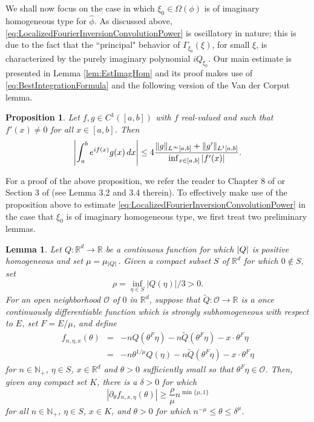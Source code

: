 \documentclass[11pt]{article}
\newtheorem{lemma}[theorem]{Lemma}
\newtheorem{proposition}[theorem]{Proposition}
\theoremstyle{remark}
\begin{document}
\noindent We shall now focus on the case in which $\xi_0\in\Omega(\phi)$ is of imaginary homogeneous type for $\widehat{\phi}$. As discussed above,  \eqref{eq:LocalizedFourierInversionConvolutionPower} is oscillatory in nature; this is due to the fact that the ``principal" behavior of $\Gamma_{\xi_0}(\xi)$, for small $\xi$, is characterized by the purely imaginary polynomial $iQ_{\xi_0}$. Our main estimate is presented in Lemma \ref{lem:EstImagHom} and its proof makes use of \eqref{eq:BestIntegrationFormula} and the following version of the Van der Corput lemma.

\begin{proposition}\label{prop:VanderCorput}
Let $f,g\in C^1([a,b])$ with $f$ real-valued and such that $f'(x)\neq 0$ for all $x\in [a,b]$. Then
\begin{equation*}
\abs{\int_a^b e^{if(x)}g(x)\,dx}\leq 4\frac{\|g\|_{L^\infty[a,b]}+\|g'\|_{L^1[a,b]}}{\inf_{x\in[a,b]}\abs{f'(x)}}.
\end{equation*}
\end{proposition}

\noindent For a proof of the above proposition, we refer the reader to Chapter 8 of \cite{stein_harmonic_1993} or Section 3 of \cite{randles_convolution_2015} (see Lemma 3.2 and 3.4 therein).  To effectively make use of the proposition above to estimate \eqref{eq:LocalizedFourierInversionConvolutionPower} in the case that $\xi_0$ is of imaginary homogeneous type, we first treat two preliminary lemmas. 

\begin{lemma}\label{lem:PhaseDerivativeEstimate}
Let $Q:\mathbb{R}^d\to\mathbb{R}$ be a continuous function for which $\abs{Q}$ is positive homogeneous and set $\mu=\mu_{\abs{Q}}$. Given a compact subset $S$ of $\mathbb{R}^d$ for which $0\notin S$, set
\begin{equation*}
    \rho=\inf_{\eta\in S}|Q(\eta)|/3>0.
\end{equation*}
For an open neighborhood $\mathcal{O}$ of $0$ in $\mathbb{R}^d$, suppose that $\widetilde{Q}:\mathcal{O}\to\mathbb{R}$ is a once continuously differentiable function which is strongly subhomogeneous with respect to $E$, set $F=E/\mu$, and define
\begin{eqnarray*}
f_{n,\eta,x}(\theta)&=&-nQ(\theta^F\eta)-n\widetilde{Q}(\theta^F\eta)-x\cdot \theta^F\eta\\
&=&-n\theta^{1/\mu}Q(\eta)-n\widetilde{Q}(\theta^{F}\eta)-x\cdot \theta^{F}\eta
\end{eqnarray*}
for $n\in\mathbb{N}_+$, $\eta\in S$, $x\in\mathbb{R}^d$ and $\theta>0$ sufficiently small so that $\theta^F\eta\in\mathcal{O}$. Then, given any compact set $K$, there is a $\delta>0$ for which
\begin{equation*}
    |\partial_\theta f_{n,x,\eta}(\theta)|\geq \frac{\rho}{\mu} n^{\min\{\mu,1\}}
\end{equation*}
for all $n\in\mathbb{N}_+$, $\eta\in S$,  $x\in K$, and $\theta>0$ for which $n^{-\mu}\leq \theta\leq \delta^\mu$.
\end{lemma}
\end{document}

